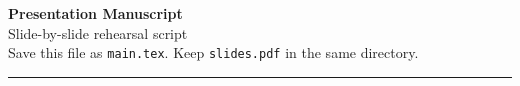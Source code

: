 \documentclass[11pt,a4paper]{article}
\newcommand{\SlidePDF}{slides.pdf}
\newcommand{\DocTitle}{Presentation Manuscript}
\newcommand{\DocSubtitle}{Slide-by-slide rehearsal script}
\begin{document}
\begin{center}
  {\LARGE\bfseries \DocTitle}\\[0.4em]
  {\large \DocSubtitle}\\[0.8em]
  {\small Save this file as \texttt{main.tex}. Keep \texttt{\SlidePDF} in the same directory.}
\end{center}

\vspace{1em}
\hrule
\vspace{1.2em}

\end{document}
